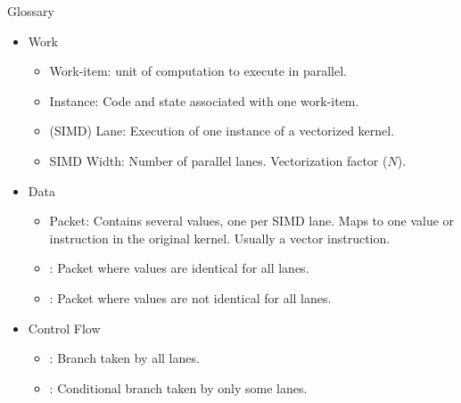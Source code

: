 \begin{frame}{Glossary}

\begin{itemize}
    \item Work
    \begin{itemize}
        \item Work-item: unit of computation to execute in parallel.
        \item Instance: Code and state associated with one work-item.
        \item (SIMD) Lane: Execution of one instance of a vectorized kernel.
        \item SIMD Width: Number of parallel lanes. Vectorization factor ($N$).
    \end{itemize}
        
    \item Data
    \begin{itemize}
        \item Packet: Contains several values, one per SIMD lane. Maps to one value or instruction in the original kernel. Usually a vector instruction.
        \item {}: Packet where values are identical for all lanes.
        \item {}: Packet where values are not identical for all lanes.
    \end{itemize}

    \item Control Flow
    \begin{itemize}
        \item {}: Branch taken by all lanes.
        \item {}: Conditional branch taken by only some lanes.
    \end{itemize}
\end{itemize}

\end{frame}
